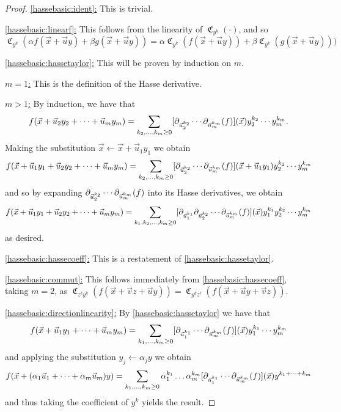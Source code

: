 \documentclass[letterpaper,11pt]{article}
\numberwithin{equation}{section}
\theoremstyle{plain}
\theoremstyle{remark}
\DeclareMathOperator{\coeffo}{\mathfrak{C}}
\newcommand{\coeff}[1]{\coeffo_{#1}}
\begin{document}
\begin{proof}
	\uline{\eqref{hassebasic:ident}:} This is trivial.

	\uline{\eqref{hassebasic:linearf}:} This follows from the linearity of $\coeff{y^k}(\cdot)$, and so
	\[
		\coeff{y^k}(\alpha f(\vec{x}+\vec{u}y)+\beta g(\vec{x}+\vec{u}y))
		=
		\alpha \coeff{y^k}(f(\vec{x}+\vec{u}y))+\beta \coeff{y^k}(g(\vec{x}+\vec{u}y)))
	\]

	\uline{\eqref{hassebasic:hassetaylor}:} This will be proven by induction on $m$.

	\uline{$m=1$:} This is the definition of the Hasse derivative.

	\uline{$m>1$:}  By induction, we have that
	\[f(\vec{x}+\vec{u}_2y_2+\cdots+\vec{u}_my_m)=\sum_{k_2,\ldots,k_m\ge 0} [\partial_{\vec{u}_2^{k_2}}\cdots\partial_{\vec{u}_m^{k_m}}(f)](\vec{x})y_2^{k_2}\cdots y_m^{k_m}.\]
	Making the substitution $\vec{x}\leftarrow\vec{x}+\vec{u}_1y_1$ we obtain
	\[f(\vec{x}+\vec{u}_1y_1+\vec{u}_2y_2+\cdots+\vec{u}_my_m)=\sum_{k_2,\ldots,k_m\ge 0} [\partial_{\vec{u}_2^{k_2}}\cdots\partial_{\vec{u}_m^{k_m}}(f)](\vec{x}+\vec{u}_1y_1)y_2^{k_2}\cdots y_m^{k_m}\]
	and so by expanding $\partial_{\vec{u}_2^{k_2}}\cdots\partial_{\vec{u}_m^{k_m}}(f)$ into its Hasse derivatives, we obtain
	\[f(\vec{x}+\vec{u}_1y_1+\vec{u}_2y_2+\cdots+\vec{u}_my_m)=\sum_{k_1,k_2,\ldots,k_m\ge 0} [\partial_{\vec{u}_1^{k_1}}\partial_{\vec{u}_2^{k_2}}\cdots\partial_{\vec{u}_m^{k_m}}(f)](\vec{x})y_1^{k_1}y_2^{k_2}\cdots y_m^{k_m}\]
	as desired.

	\uline{\eqref{hassebasic:hassecoeff}:} This is a restatement of \eqref{hassebasic:hassetaylor}.
	
	\uline{\eqref{hassebasic:commut}:} This follows immediately from \eqref{hassebasic:hassecoeff}, taking $m=2$, as $\coeff{z^\ell y^k}(f(\vec{x}+\vec{v}z+\vec{u}y))=\coeff{y^kz^\ell}(f(\vec{x}+\vec{u}y+\vec{v}z))$.

	\uline{\eqref{hassebasic:directionlinearity}:} By \eqref{hassebasic:hassetaylor} we have that
	\[f(\vec{x}+\vec{u}_1y_1+\cdots+\vec{u}_my_m)=\sum_{k_1,\ldots,k_m\ge 0} [\partial_{\vec{u}_1^{k_1}}\cdots\partial_{\vec{u}_m^{k_m}}(f)](\vec{x})y_1^{k_1}\cdots y_m^{k_m}\]
	and applying the substitution $y_j\leftarrow \alpha_jy$ we obtain
	\[f(\vec{x}+(\alpha_1\vec{u}_1+\cdots+\alpha_m\vec{u}_m)y)=\sum_{k_1,\ldots,k_m\ge 0} \alpha_1^{k_1}\ldots\alpha_m^{k_m}[\partial_{\vec{u}_1^{k_1}}\cdots\partial_{\vec{u}_m^{k_m}}(f)](\vec{x})y^{k_1+\cdots+k_m}\]
	and thus taking the coefficient of $y^k$ yields the result.


\end{proof}
\end{document}
